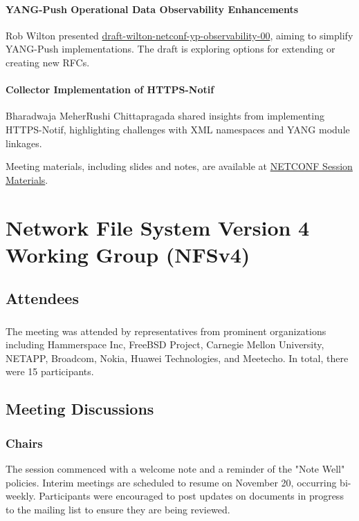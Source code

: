 \documentclass{article}
\begin{document}
\paragraph{YANG-Push Operational Data Observability Enhancements}
Rob Wilton presented \href{https://datatracker.ietf.org/doc/html/draft-wilton-netconf-yp-observability-00}{draft-wilton-netconf-yp-observability-00}, aiming to simplify YANG-Push implementations. The draft is exploring options for extending or creating new RFCs.

\paragraph{Collector Implementation of HTTPS-Notif}
Bharadwaja MeherRushi Chittapragada shared insights from implementing HTTPS-Notif, highlighting challenges with XML namespaces and YANG module linkages.

Meeting materials, including slides and notes, are available at \href{https://datatracker.ietf.org/meeting/121/session/netconf}{NETCONF Session Materials}.



\newpage

\section{Network File System Version 4 Working Group (NFSv4)}

\subsection{Attendees}
\subsubsection{}
The meeting was attended by representatives from prominent organizations including Hammerspace Inc, FreeBSD Project, Carnegie Mellon University, NETAPP, Broadcom, Nokia, Huawei Technologies, and Meetecho. In total, there were 15 participants.

\subsection{Meeting Discussions}

\subsubsection{Chairs}
The session commenced with a welcome note and a reminder of the "Note Well" policies. Interim meetings are scheduled to resume on November 20, occurring bi-weekly. Participants were encouraged to post updates on documents in progress to the mailing list to ensure they are being reviewed.
\end{document}
